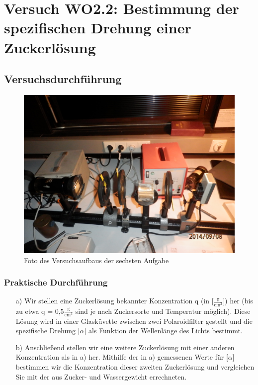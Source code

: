 \documentclass[12pt]{scrartcl}
\begin{document}
\section{Versuch WO2.2:
Bestimmung der spezifischen Drehung einer Zuckerlösung}
\subsection{Versuchsdurchführung}

\begin{figure}[H]
\centering
    \includegraphics[scale = 0.1]{aufgabe_6.JPG}
  	\caption[Foto des Versuchsaufbaus der sechsten Aufgabe]{Foto des Versuchsaufbaus der sechsten Aufgabe}
  \label{fig:aufgabe_2}
\end{figure}

\subsubsection{Praktische Durchführung}
\begin{enumerate}
\item[a)] Wir stellen eine Zuckerlösung bekannter Konzentration q (in [$\frac{\text{g}}{\text{cm}^3}]$)
her (bis zu etwa q = 0,5$\frac{\text{g}}{\text{cm}^3}$
sind je nach Zuckersorte und Temperatur möglich).
Diese Lösung wird in einer Glasküvette zwischen zwei Polaroidfilter gestellt und die spezifische Drehung [$\alpha$]
als Funktion der Wellenlänge des Lichts bestimmt.
\item[b)] Anschließend stellen wir eine weitere Zuckerlösung mit einer anderen Konzentration als
in a) her. Mithilfe der in a) gemessenen Werte für
[$\alpha$] bestimmen wir die Konzentration dieser zweiten Zuckerlösung und vergleichen Sie mit der aus Zucker- und
Wassergewicht errechneten.
\end{enumerate}
\end{document}
